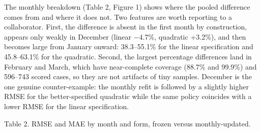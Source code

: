 The monthly breakdown (Table 2, Figure 1) shows where the pooled
difference comes from and where it does not. Two features are worth
reporting to a collaborator. First, the difference is absent in the
first month by construction, appears only weakly in December (linear
−4.7\%, quadratic +3.2\%), and then becomes large from January onward:
38.3--55.1\% for the linear specification and 45.8--63.1\% for the
quadratic. Second, the largest percentage differences land in February
and March, which have near-complete coverage (88.7\% and 99.9\%) and
596--743 scored cases, so they are not artifacts of tiny samples.
December is the one genuine counter-example: the monthly refit is
followed by a slightly higher RMSE for the better-specified quadratic
while the same policy coincides with a lower RMSE for the linear
specification.

Table 2. RMSE and MAE by month and form, frozen versus monthly-updated.

